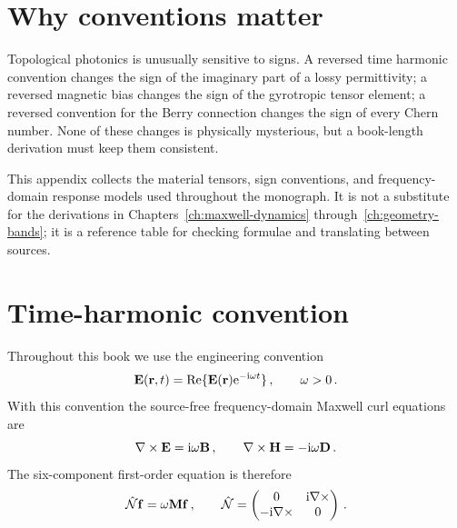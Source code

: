 
\section{Why conventions matter}
\label{sec:appD-why}

Topological photonics is unusually sensitive to signs.  A reversed time
harmonic convention changes the sign of the imaginary part of a lossy
permittivity; a reversed magnetic bias changes the sign of the
gyrotropic tensor element; a reversed convention for the Berry
connection changes the sign of every Chern number.  None of these
changes is physically mysterious, but a book-length derivation must keep
them consistent.

This appendix collects the material tensors, sign conventions, and
frequency-domain response models used throughout the monograph.  It is
not a substitute for the derivations in Chapters~\ref{ch:maxwell-dynamics}
through~\ref{ch:geometry-bands}; it is a reference table for checking
formulae and translating between sources.

\section{Time-harmonic convention}
\label{sec:appD-convention}

Throughout this book we use the engineering convention
\begin{equation}\label{eq:appD-time-convention}
  \mathbf{E}(\mathbf{r},t)=\mathrm{Re}\{\mathbf{E}(\mathbf{r})\mathrm{e}^{-\mathrm{i}\omega t}\}\,,
  \qquad \omega>0\,.
\end{equation}
With this convention the source-free frequency-domain Maxwell curl
equations are
\begin{equation}\label{eq:appD-maxwell-frequency}
  \nabla\times\mathbf{E} = \mathrm{i}\omega\mathbf{B}\,,
  \qquad
  \nabla\times\mathbf{H} = -\mathrm{i}\omega\mathbf{D}\,.
\end{equation}
The six-component first-order equation is therefore
\begin{equation}\label{eq:appD-first-order}
  \hat{\mathcal{N}}\mathbf{f}=\omega\mathbf{M}\mathbf{f}\,,
  \qquad
  \hat{\mathcal{N}}=\begin{pmatrix}0&\mathrm{i}\nabla\times\\-\mathrm{i}\nabla\times&0\end{pmatrix}\,.
\end{equation}

